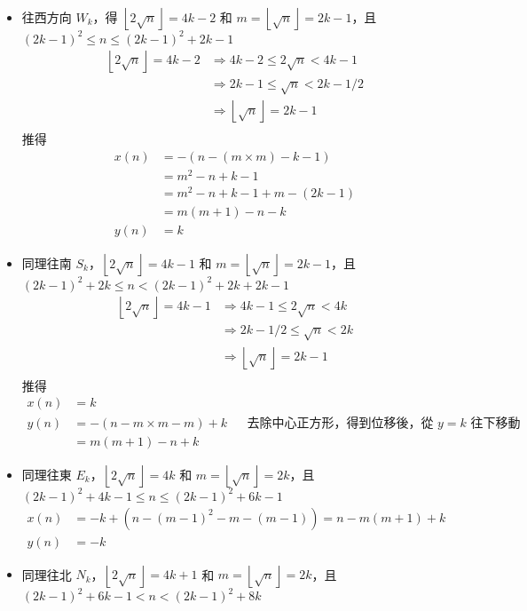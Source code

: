 \documentclass[11pt]{article}
\begin{document}
\begin{itemize}
	\item 往西方向 $W_k$，得 $\left \lfloor 2 \sqrt{n} \right \rfloor = 4k - 2$ 和 $m = \left \lfloor \sqrt{n} \right \rfloor = 2k - 1$，且 $(2k - 1)^2\le n \le (2k-1)^2 + 2k-1$
		\begin{align*}
			\left \lfloor 2 \sqrt{n} \right \rfloor = 4k - 2 &
				\Rightarrow 4k-2 \le 2 \sqrt{n} < 4k - 1 \\
			& \Rightarrow 2k-1 \le \sqrt{n} < 2k - 1/2 \\
			& \Rightarrow \left \lfloor \sqrt{n} \right \rfloor = 2k-1 \\
		\end{align*}
	推得 
		\begin{align*}
			x(n) &= - (n - (m \times m) - k - 1) \\
				 &= m^2 - n + k - 1 \\
				 &= m^2 - n + k - 1 + m - (2 k - 1) \\
				 &= m(m+1) - n - k \\
			y(n) &= k
		\end{align*}
	\item 同理往南 $S_k$，$\left \lfloor 2 \sqrt{n} \right \rfloor = 4k - 1$ 和 $m = \left \lfloor\sqrt{n} \right \rfloor = 2k - 1$，且 $(2k-1)^2 + 2k \le n < (2k-1)^2 + 2k + 2k-1$
		\begin{align*}
			\left \lfloor 2 \sqrt{n} \right \rfloor = 4k - 1 &
				\Rightarrow 4k-1 \le 2 \sqrt{n} < 4k \\
			& \Rightarrow 2k-1/2 \le \sqrt{n} < 2k \\
			& \Rightarrow \left \lfloor \sqrt{n} \right \rfloor = 2k-1 \\
		\end{align*}
		推得 
		\begin{align*}
			x(n) &= k \\
			y(n) &= - (n - m \times m - m) + k && \text{去除中心正方形，得到位移後，從 } y = k \text{ 往下移動} \\
				 &= m(m+1) - n + k
		\end{align*}
	\item 同理往東 $E_k$，$\left \lfloor 2 \sqrt{n} \right \rfloor = 4k$ 和 $m = \left \lfloor\sqrt{n} \right \rfloor = 2k$，且 $(2k-1)^2 + 4k - 1 \le n \le (2k-1)^2 + 6k - 1$
		\begin{align*}
			x(n) &= -k + (n - (m-1)^2 - m - (m-1)) = n - m(m+1) + k \\
			y(n) &= -k
		\end{align*}
	\item 同理往北 $N_k$，$\left \lfloor 2 \sqrt{n} \right \rfloor = 4k+1$ 和 $m = \left \lfloor\sqrt{n} \right \rfloor = 2k$，且 $(2k-1)^2 + 6k - 1 < n < (2k-1)^2 + 8k$

\end{itemize}
\end{document}
